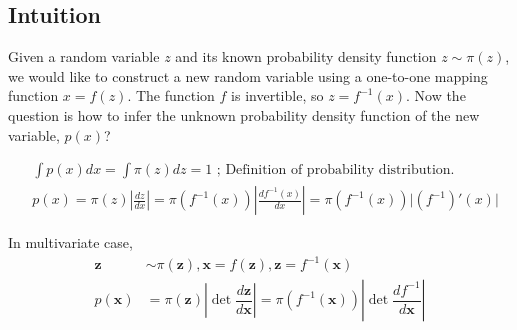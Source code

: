 \subsection{Intuition}
Given a random variable $z$ and its known probability density function $z\sim \pi(z)$, we would like to construct a new random variable using a one-to-one mapping function $x=f(z)$. The function $f$ is invertible, so $z = f^{-1}(x)$. Now the question is how to infer the unknown probability density function of the new variable, $p(x)$?

$$
\begin{aligned}
& \int p(x)dx = \int \pi(z)dz = 1 \scriptstyle{\text{   ; Definition of probability distribution.}}\\
& p(x) = \pi(z) \left\vert\frac{dz}{dx}\right\vert = \pi(f^{-1}(x)) \left\vert\frac{d f^{-1}(x)}{dx}\right\vert = \pi(f^{-1}(x)) \vert (f^{-1})'(x) \vert
\end{aligned}$$

In multivariate case, 
$$
\begin{aligned}
\mathbf{z} &\sim \pi(\mathbf{z}), \mathbf{x} = f(\mathbf{z}), \mathbf{z} = f^{-1}(\mathbf{x}) \\
p(\mathbf{x}) 
&= \pi(\mathbf{z}) \left\vert \det \dfrac{d \mathbf{z}}{d \mathbf{x}} \right\vert  
= \pi(f^{-1}(\mathbf{x})) \left\vert \det \dfrac{d f^{-1}}{d \mathbf{x}} \right\vert
\end{aligned}$$








